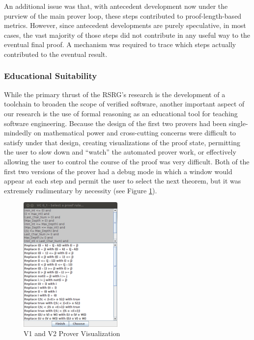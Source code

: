 An additional issue was that, with antecedent development now under the purview of the main prover loop, these steps contributed to proof-length-based metrics.  However, since antecedent developments are purely speculative, in most cases, the vast majority of those steps did not contribute in any useful way to the eventual final proof.  A mechanism was required to trace which steps actually contributed to the eventual result.

		\subsubsection{Educational Suitability}	

While the primary thrust of the RSRG's research is the development of a toolchain to broaden the scope of verified software, another important aspect of our research is the use of formal reasoning as an educational tool for teaching software engineering.  Because the design of the first two provers had been single-mindedly on mathematical power and cross-cutting concerns were difficult to satisfy under that design, creating visualizations of the proof state, permitting the user to slow down and ``watch'' the automated prover work, or effectively allowing the user to control the course of the proof was very difficult.  Both of the first two versions of the prover had a debug mode in which a window would appear at each step and permit the user to select the next theorem, but it was extremely rudimentary by necessity (see Figure \ref{proverDebugMode}).

\begin{figure}
  \centering
    \includegraphics[width=0.45\textwidth]{proverDebugMode}
  \caption{V1 and V2 Prover Visualization\label{proverDebugMode}}
\end{figure}

